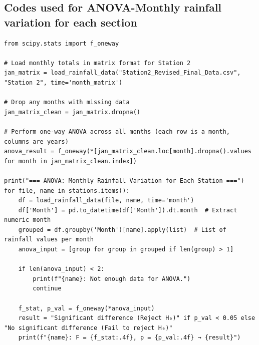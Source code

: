 \documentclass[12pt]{article}
\theoremstyle{definition}
\begin{document}
\subsection{Codes used for ANOVA-Monthly rainfall variation for each section}
\begin{verbatim}
from scipy.stats import f_oneway

# Load monthly totals in matrix format for Station 2
jan_matrix = load_rainfall_data("Station2_Revised_Final_Data.csv", "Station 2", time='month_matrix')

# Drop any months with missing data
jan_matrix_clean = jan_matrix.dropna()

# Perform one-way ANOVA across all months (each row is a month, columns are years)
anova_result = f_oneway(*[jan_matrix_clean.loc[month].dropna().values for month in jan_matrix_clean.index])

print("=== ANOVA: Monthly Rainfall Variation for Each Station ===")
for file, name in stations.items():
    df = load_rainfall_data(file, name, time='month')
    df['Month'] = pd.to_datetime(df['Month']).dt.month  # Extract numeric month
    grouped = df.groupby('Month')[name].apply(list)  # List of rainfall values per month
    anova_input = [group for group in grouped if len(group) > 1]
    
    if len(anova_input) < 2:
        print(f"{name}: Not enough data for ANOVA.")
        continue

    f_stat, p_val = f_oneway(*anova_input)
    result = "Significant difference (Reject H₀)" if p_val < 0.05 else "No significant difference (Fail to reject H₀)"
    print(f"{name}: F = {f_stat:.4f}, p = {p_val:.4f} → {result}")
\end{verbatim}
\end{document}
